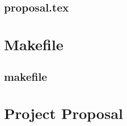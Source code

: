 \documentclass[12pt,a4paper,twoside,openright]{report}
\begin{document}
\section{proposal.tex}
{\scriptsize}

\chapter{Makefile}

\section{makefile}\label{makefile}



\chapter{Project Proposal}

%
\end{document}
